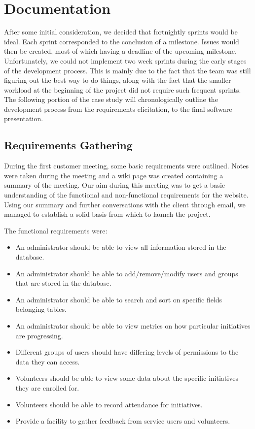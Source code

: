 \documentclass{l3proj}
\begin{document}
\section{Documentation}
\label{documentation}

After some initial consideration, we decided that fortnightly sprints would be ideal. Each sprint corresponded to the conclusion of a milestone. Issues would then be created, most of which having a deadline of the upcoming milestone. Unfortunately, we could not implement two week sprints during the early stages of the development process. This is mainly due to the fact that the team was still figuring out the best way to do things, along with the fact that the smaller workload at the beginning of the project did not require such frequent sprints. The following portion of the case study will chronologically outline the development process from the requirements elicitation, to the final software presentation.

\subsection{Requirements Gathering}
\label{requirements}

During the first customer meeting, some basic requirements were outlined. Notes were taken during the meeting and a wiki page was created containing a summary of the meeting. Our aim during this meeting was to get a basic understanding of the functional and non-functional requirements for the website. Using our summary and further conversations with the client through email, we managed to establish a solid basis from which to launch the project.

The functional requirements were:
\begin{itemize}
\item An administrator should be able to view all information stored in the database.
\item An administrator should be able to add/remove/modify users and groups that are stored in the database.
\item An administrator should be able to search and sort on specific fields belonging tables.
\item An administrator should be able to view metrics on how particular initiatives are progressing.
\item Different groups of users should have differing levels of permissions to the data they can access.
\item Volunteers should be able to view some data about the specific initiatives they are enrolled for.
\item Volunteers should be able to record attendance for initiatives.
\item Provide a facility to gather feedback from service users and volunteers.
\end{itemize}
\end{document}
